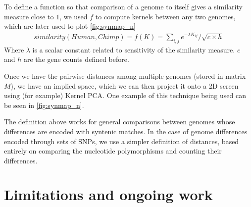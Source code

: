\documentclass{vgtc}                      %
\begin{document}

To define a function so that comparison of a genome to itself gives a similarity measure close to $1$, we used $f$ to compute kernels between any two genomes, which are later used to plot \autoref{fig:synmap_n}
\begin{align}
similarity(Human, Chimp) = f(K) = \sum_{i,j} e^{-\lambda K_{ij}}/\sqrt{c \times h}
\end{align}
Where $\lambda$ is a scalar constant related to sensitivity of the similarity measure. $c$ and $h$ are the gene counts defined before. 

Once we have the pairwise distances among multiple genomes (stored in matrix $M$), we have an implied space, which we can then project it onto a 2D screen using (for example) Kernel PCA.
One example of this technique being used can be seen in \autoref{fig:synmap_n}.

The definition above works for general comparisons between genomes whose differences are encoded with syntenic matches.
In the case of genome differences encoded through sets of SNPs, we use a simpler definition of distances, based entirely on comparing the nucleotide polymorphisms and counting their differences.

\section{Limitations and ongoing work}
\end{document}
